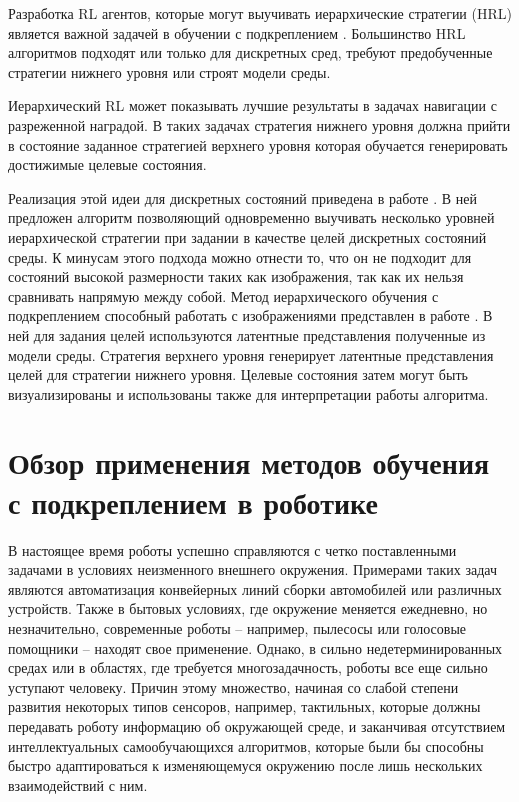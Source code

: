 Разработка RL агентов, которые могут выучивать иерархические стратегии (HRL) является важной задачей в обучении с подкреплением \cite{Sutton1999, dietterich2000hierarchical, mcGovern}. Большинство HRL алгоритмов подходят или только для дискретных сред,
требуют предобученные стратегии нижнего уровня или строят модели среды.

Иерархический RL может показывать лучшие результаты в задачах навигации с разреженной наградой. В таких задачах стратегия нижнего уровня должна прийти в состояние заданное стратегией верхнего уровня которая обучается генерировать достижимые целевые состояния. 

Реализация этой идеи для дискретных состояний приведена в работе \cite{levy2017learning}. В ней предложен алгоритм позволяющий одновременно выучивать несколько уровней иерархической стратегии при задании в качестве целей дискретных состояний среды. К минусам этого подхода можно отнести то, что он не подходит для состояний высокой размерности таких как изображения, так как их нельзя сравнивать напрямую между собой. 
Метод иерархического обучения с подкреплением способный работать с изображениями представлен в  работе \cite{hafner2022deep}. В ней для задания целей используются латентные представления полученные из модели среды. Стратегия верхнего уровня генерирует латентные представления целей для стратегии нижнего уровня. Целевые состояния  затем могут быть визуализированы и использованы также для интерпретации работы алгоритма. 



\section{Обзор применения методов обучения с подкреплением в роботике}\label{sec:ch1/sec2}

В настоящее время роботы успешно справляются с четко поставленными задачами в условиях неизменного внешнего окружения. Примерами таких задач являются автоматизация конвейерных линий сборки автомобилей или различных устройств. Также в бытовых условиях, где окружение меняется ежедневно, но незначительно, современные роботы – например, пылесосы или голосовые помощники – находят свое применение. Однако, в сильно недетерминированных средах или в областях, где требуется многозадачность, роботы все еще сильно уступают человеку. Причин этому множество, начиная со слабой степени развития некоторых типов сенсоров, например, тактильных, которые должны передавать роботу информацию об окружающей среде, и заканчивая отсутствием интеллектуальных самообучающихся алгоритмов, которые были бы способны быстро адаптироваться к изменяющемуся окружению после лишь нескольких взаимодействий с ним. 

